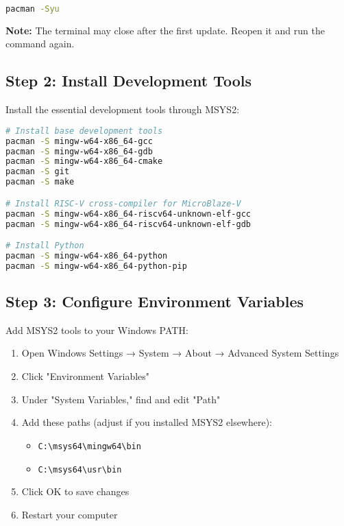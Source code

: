 \documentclass[11pt,a4paper]{article}
\begin{document}
\begin{lstlisting}[language=bash]
pacman -Syu
\end{lstlisting}

\textbf{Note:} The terminal may close after the first update. Reopen it and run the command again.

\subsection{Step 2: Install Development Tools}
Install the essential development tools through MSYS2:

\begin{lstlisting}[language=bash]
# Install base development tools
pacman -S mingw-w64-x86_64-gcc
pacman -S mingw-w64-x86_64-gdb
pacman -S mingw-w64-x86_64-cmake
pacman -S git
pacman -S make

# Install RISC-V cross-compiler for MicroBlaze-V
pacman -S mingw-w64-x86_64-riscv64-unknown-elf-gcc
pacman -S mingw-w64-x86_64-riscv64-unknown-elf-gdb

# Install Python
pacman -S mingw-w64-x86_64-python
pacman -S mingw-w64-x86_64-python-pip
\end{lstlisting}

\subsection{Step 3: Configure Environment Variables}
Add MSYS2 tools to your Windows PATH:

\begin{enumerate}
    \item Open Windows Settings → System → About → Advanced System Settings
    \item Click "Environment Variables"
    \item Under "System Variables," find and edit "Path"
    \item Add these paths (adjust if you installed MSYS2 elsewhere):
    \begin{itemize}
        \item \texttt{C:\textbackslash msys64\textbackslash mingw64\textbackslash bin}
        \item \texttt{C:\textbackslash msys64\textbackslash usr\textbackslash bin}
    \end{itemize}
    \item Click OK to save changes
    \item Restart your computer
\end{enumerate}
\end{document}
